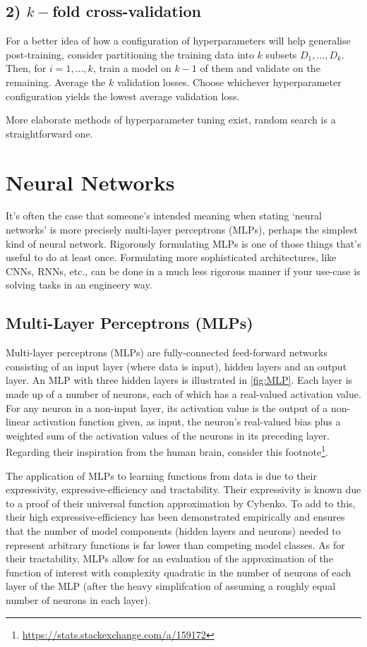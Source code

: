 \documentclass[11pt]{article}
\begin{document}
\subsection*{2) $k-$fold cross-validation}
For a better idea of how a configuration of hyperparameters will help generalise post-training, consider partitioning the training data into $k$ subsets $D_1,\dots,D_k$. Then, for $i=1,\dots,k$, train a model on $k-1$ of them and validate on the remaining. Average the $k$ validation losses. Choose whichever hyperparameter configuration yields the lowest average validation loss.

More elaborate methods of hyperparameter tuning exist, random search is a straightforward one.


\section{Neural Networks}
It's often the case that someone's intended meaning when stating `neural networks' is more precisely multi-layer perceptrons (MLPs), perhaps the simplest kind of neural network. Rigorously formulating MLPs is one of those things that's useful to do at least once. Formulating more sophisticated architectures, like CNNs, RNNs, etc., can be done in a much less rigorous manner if your use-case is solving tasks in an engineery way.

\subsection{Multi-Layer Perceptrons (MLPs)}
\label{sec:multi_layer_perceptrons}

Multi-layer perceptrons (MLPs) are fully-connected feed-forward networks consisting of an input layer (where data is input), hidden layers and an output layer. An MLP with three hidden layers is illustrated in \autoref{fig:MLP}. Each layer is made up of a number of neurons, each of which has a real-valued activation value.  For any neuron in a non-input layer, its activation value is the output of a non-linear activation function given, as input, the neuron's real-valued bias plus a weighted sum of the activation values of the neurons in its preceding layer. Regarding their inspiration from the human brain, consider this footnote\footnote{\url{https://stats.stackexchange.com/a/159172}}.

The application of MLPs to learning functions from data is due to their expressivity, expressive-efficiency and tractability. Their expressivity is known due to a proof of their universal function approximation by Cybenko. To add to this, their high expressive-efficiency has been demonstrated empirically and ensures that the number of model components (hidden layers and neurons) needed to represent arbitrary functions is far lower than competing model classes. As for their tractability, MLPs allow for an evaluation of the approximation of the function of interest with complexity quadratic in the number of neurons of each layer of the MLP (after the heavy simplifcation of assuming a roughly equal number of neurons in each layer).
\end{document}
